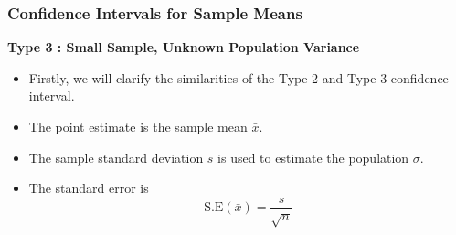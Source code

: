 \begin{frame}
\frametitle{Confidence Intervals for Sample Means}
\textbf{Type 3 : Small Sample, Unknown Population Variance}\\
\begin{itemize}
\item Firstly, we will clarify the similarities of the Type 2 and Type 3 confidence interval.
\item The point estimate is the sample mean $\bar{x}$.
\item The sample standard deviation $s$ is used to estimate the population $\sigma$.
\item The standard error is 
\[ \mbox{S.E}(\bar{x}) = \frac{s}{\sqrt{n}}\]
\end{itemize}
\end{frame}
